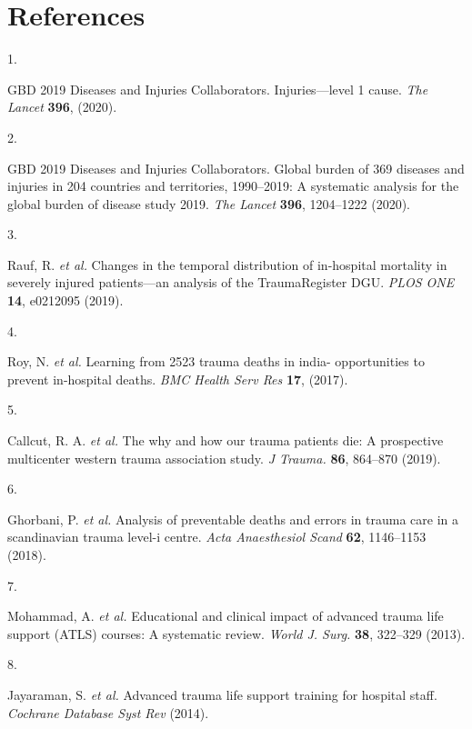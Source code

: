 \documentclass[
]{scrartcl}
\newlength{\cslhangindent}
\newlength{\csllabelwidth}
\newlength{\cslentryspacingunit} %
\newenvironment{CSLReferences}[2] %
 {%
  \setlength{\parindent}{0pt}
  \ifodd #1
  \let\oldpar\par
  \def\par{\hangindent=\cslhangindent\oldpar}
  \fi
  \setlength{\parskip}{#2\cslentryspacingunit}
 }%
 {}
\newcommand{\CSLLeftMargin}[1]{\parbox[t]{\csllabelwidth}{#1}}
\newcommand{\CSLRightInline}[1]{\parbox[t]{\linewidth - \csllabelwidth}{#1}\break}
\begin{document}
\hypertarget{references}{%
\section{References}\label{references}}

\hypertarget{refs}{}
\begin{CSLReferences}{0}{0}
\leavevmode{}%
\CSLLeftMargin{1. }%
\CSLRightInline{GBD 2019 Diseases and Injuries Collaborators.
Injuries---level 1 cause. \emph{The Lancet} \textbf{396}, (2020).}

\leavevmode{}%
\CSLLeftMargin{2. }%
\CSLRightInline{GBD 2019 Diseases and Injuries Collaborators. Global
burden of 369 diseases and injuries in 204 countries and territories,
1990--2019: A systematic analysis for the global burden of disease study
2019. \emph{The Lancet} \textbf{396}, 1204--1222 (2020).}

\leavevmode{}%
\CSLLeftMargin{3. }%
\CSLRightInline{Rauf, R. \emph{et al.} Changes in the temporal
distribution of in-hospital mortality in severely injured patients---an
analysis of the TraumaRegister DGU. \emph{PLOS ONE} \textbf{14},
e0212095 (2019).}

\leavevmode{}%
\CSLLeftMargin{4. }%
\CSLRightInline{Roy, N. \emph{et al.} Learning from 2523 trauma deaths
in india- opportunities to prevent in-hospital deaths. \emph{BMC Health
Serv Res} \textbf{17}, (2017).}

\leavevmode{}%
\CSLLeftMargin{5. }%
\CSLRightInline{Callcut, R. A. \emph{et al.} The why and how our trauma
patients die: A prospective multicenter western trauma association
study. \emph{J Trauma.} \textbf{86}, 864--870 (2019).}

\leavevmode{}%
\CSLLeftMargin{6. }%
\CSLRightInline{Ghorbani, P. \emph{et al.} Analysis of preventable
deaths and errors in trauma care in a scandinavian trauma level-i
centre. \emph{Acta Anaesthesiol Scand} \textbf{62}, 1146--1153 (2018).}

\leavevmode{}%
\CSLLeftMargin{7. }%
\CSLRightInline{Mohammad, A. \emph{et al.} Educational and clinical
impact of advanced trauma life support (ATLS) courses: A systematic
review. \emph{World J. Surg.} \textbf{38}, 322--329 (2013).}

\leavevmode{}%
\CSLLeftMargin{8. }%
\CSLRightInline{Jayaraman, S. \emph{et al.} Advanced trauma life support
training for hospital staff. \emph{Cochrane Database Syst Rev} (2014).}


\end{CSLReferences}
\end{document}
